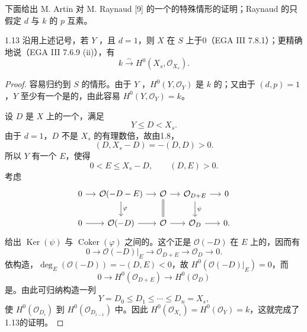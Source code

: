 下面给出 M. Artin 对 M. Raynaud [9] 的一个的特殊情形的证明；Raynaud 的只假定 $d$ 与 $k$ 的 $p$ 互素。
\begin{SGAresult}{}{1.13}
沿用上述记号，若 $Y$ ，且 $d=1$，则 $X$ 在 $S$ 上于0（EGA III 7.8.1）；更精确地说（EGA III 7.6.9 (ii)），有
\[
k\xrightarrow{\sim}H^0(X_s,\mathcal O_{X_s}).
\]
\end{SGAresult}
\begin{proof}
容易归约到 $S$ 的情形。由于 $Y$ ，$H^0(Y,\mathcal O_Y)$ 是 $k$ 的；又由于 $(d,p)=1$，$Y$ 至少有一个是的，由此容易 $H^0(Y,\mathcal O_Y)=k$。

设 $D$ 是 $X$ 上的一个，满足
\[
Y\leq D<X_s.
\]
由于 $d=1$，$D$ 不是 $X_s$ 的有理数倍，故由1.8，
\[
(D,X_s-D)=-(D,D)>0.
\]
所以 $Y$ 有一个 $E$，使得
\[
0<E\leq X_s-D,\qquad(D,E)>0.
\]
考虑
\[
\begin{tikzcd}[column sep=small]
0\arrow[r]&\mathcal O(-D-E)\arrow[r]\arrow[d,"\varphi"]&\mathcal O\arrow[r]\arrow[d,equal]&\mathcal O_{D+E}\arrow[r]\arrow[d,"\psi"]&0\\
0\arrow[r]&\mathcal O(-D)\arrow[r]&\mathcal O\arrow[r]&\mathcal O_D\arrow[r]&0.
\end{tikzcd}
\]
给出 $\operatorname{Ker}(\psi)$ 与 $\operatorname{Coker}(\varphi)$ 之间的。这个正是 $\mathcal O(-D)$ 在 $E$ 上的，因而有
\[
0\longrightarrow\mathcal O(-D)|_E\longrightarrow\mathcal O_{D+E}\longrightarrow\mathcal O_D\longrightarrow0.
\]
依构造，$\deg_E(\mathcal O(-D))=-(D,E)<0$，故 $H^0(\mathcal O(-D)|_E)=0$，而
\[
0\longrightarrow H^0(\mathcal O_{D+E})\longrightarrow H^0(\mathcal O_D)
\]
是。由此可归纳构造一列
\[
Y=D_0\leq D_1\leq\cdots\leq D_n=X_s,
\]
使 $H^0(\mathcal O_{D_i})$ 到 $H^0(\mathcal O_{D_{i-1}})$ 中。因此 $H^0(\mathcal O_{X_s})=H^0(\mathcal O_Y)=k$，这就完成了1.13的证明。
\end{proof}
